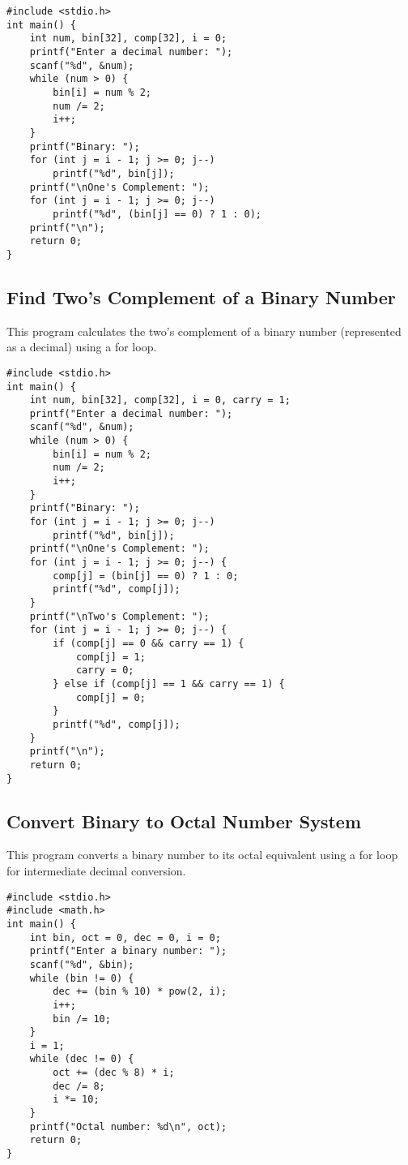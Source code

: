 \documentclass[a4paper,12pt]{article}
\begin{document}
\begin{lstlisting}[caption={Find One’s Complement of a Binary Number}]
#include <stdio.h>
int main() {
    int num, bin[32], comp[32], i = 0;
    printf("Enter a decimal number: ");
    scanf("%d", &num);
    while (num > 0) {
        bin[i] = num % 2;
        num /= 2;
        i++;
    }
    printf("Binary: ");
    for (int j = i - 1; j >= 0; j--)
        printf("%d", bin[j]);
    printf("\nOne's Complement: ");
    for (int j = i - 1; j >= 0; j--)
        printf("%d", (bin[j] == 0) ? 1 : 0);
    printf("\n");
    return 0;
}
\end{lstlisting}

\newpage

\subsection{Find Two’s Complement of a Binary Number}
This program calculates the two’s complement of a binary number (represented as a decimal) using a for loop.

\begin{lstlisting}[caption={Find Two’s Complement of a Binary Number}]
#include <stdio.h>
int main() {
    int num, bin[32], comp[32], i = 0, carry = 1;
    printf("Enter a decimal number: ");
    scanf("%d", &num);
    while (num > 0) {
        bin[i] = num % 2;
        num /= 2;
        i++;
    }
    printf("Binary: ");
    for (int j = i - 1; j >= 0; j--)
        printf("%d", bin[j]);
    printf("\nOne's Complement: ");
    for (int j = i - 1; j >= 0; j--) {
        comp[j] = (bin[j] == 0) ? 1 : 0;
        printf("%d", comp[j]);
    }
    printf("\nTwo's Complement: ");
    for (int j = i - 1; j >= 0; j--) {
        if (comp[j] == 0 && carry == 1) {
            comp[j] = 1;
            carry = 0;
        } else if (comp[j] == 1 && carry == 1) {
            comp[j] = 0;
        }
        printf("%d", comp[j]);
    }
    printf("\n");
    return 0;
}
\end{lstlisting}

\newpage

\subsection{Convert Binary to Octal Number System}
This program converts a binary number to its octal equivalent using a for loop for intermediate decimal conversion.

\begin{lstlisting}[caption={Convert Binary to Octal Number System}]
#include <stdio.h>
#include <math.h>
int main() {
    int bin, oct = 0, dec = 0, i = 0;
    printf("Enter a binary number: ");
    scanf("%d", &bin);
    while (bin != 0) {
        dec += (bin % 10) * pow(2, i);
        i++;
        bin /= 10;
    }
    i = 1;
    while (dec != 0) {
        oct += (dec % 8) * i;
        dec /= 8;
        i *= 10;
    }
    printf("Octal number: %d\n", oct);
    return 0;
}
\end{lstlisting}
\end{document}
